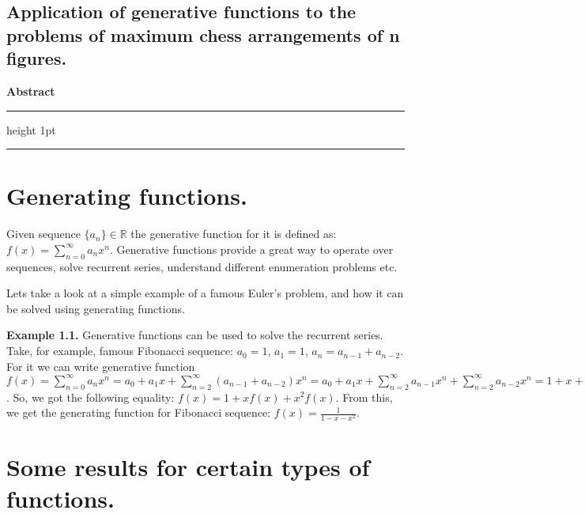 \documentclass[a4paper,11pt]{article}
\begin{document}


\begin{large}

\begin{center}
\section*{Application of generative functions to the problems of maximum chess arrangements of n figures.}
\end{center}

\medskip

\begin{center}
\textbf{Abstract}
\end{center}


\hrule height 1pt
\vskip 3pt \hrule

\medskip
\medskip


\section*{Generating functions.}

Given sequence $\{a_{n}\}\in \mathbb{R}$ the generative function for it is defined as: $f(x)=\sum\limits_{n=0}^{\infty}a_{n}x^{n}.$ Generative functions provide a great way to operate over sequences, solve recurrent series, understand different enumeration problems etc.

Lets take a look at a simple example of a famous Euler's problem, and how it can be solved using generating functions.

\textbf{Example 1.1.}
Generative functions can be used to solve the recurrent series. Take, for example, famous Fibonacci sequence: $a_{0}=1$, $a_{1}=1$, $a_{n} = a_{n-1}+a_{n-2}$. For it we can write generative function $f(x) = \sum\limits_{n=0}^{\infty}a_{n}x^{n} =a_{0} + a_{1}x + \sum\limits_{n=2}^{\infty}(a_{n-1} + a_{n-2})x^{n} = a_{0} + a_{1}x + \sum\limits_{n=2}^{\infty}a_{n-1}x^{n} + \sum\limits_{n=2}^{\infty}a_{n-2}x^{n} = 1 + x + \sum\limits_{n=0}^{\infty}a_{n}x^{n+1} - x + \sum\limits_{n=0}^{\infty}a_{n}x^{n+2} = 1 + x\sum\limits_{n=0}^{\infty}a_{n}x^{n} + x^{2}\sum\limits_{n=0}^{\infty}a_{n}x^{n} = 1 + xf(x) + x^{2}f(x)$. So, we got the following equality: $f(x) = 1 + xf(x) + x^{2}f(x)$. From this, we get the generating function for Fibonacci sequence: $f(x) = \frac{1}{1 - x - x^{2}}$.


\section*{Some results for certain types of functions.}




\end{large}
\end{document}
